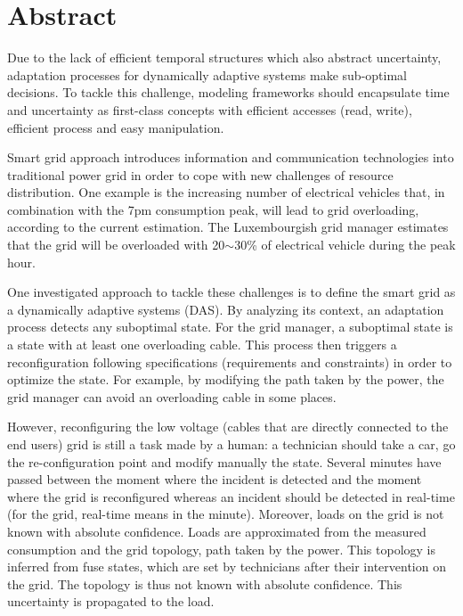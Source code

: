 \chapter*{Abstract}

{
    Due to the lack of efficient temporal structures which also abstract uncertainty, adaptation processes for dynamically adaptive systems make sub-optimal decisions.
	To tackle this challenge, modeling frameworks should encapsulate time and uncertainty as first-class concepts with efficient accesses (read, write), efficient process and easy manipulation.
}

Smart grid approach introduces information and communication technologies into traditional power grid in order to cope with new challenges of resource distribution.
One example is the increasing number of electrical vehicles that, in combination with the 7pm consumption peak, will lead to grid overloading, according to the current estimation.
The Luxembourgish grid manager estimates that the grid will be overloaded with 20$\sim$30\% of electrical vehicle during the peak hour.

One investigated approach to tackle these challenges is to define the smart grid as a dynamically adaptive systems (DAS).
By analyzing its context, an adaptation process detects any suboptimal state.
For the grid manager, a suboptimal state is a state with at least one overloading cable.
This process then triggers a reconfiguration following specifications (requirements and constraints) in order to optimize the state.
For example, by modifying the path taken by the power, the grid manager can avoid an overloading cable in some places.

However, reconfiguring the low voltage (cables that are directly connected to the end users) grid is still a task made by a human: a technician should take a car, go the re-configuration point and modify manually the state.
Several minutes have passed between the moment where the incident is detected and the moment where the grid is reconfigured whereas an incident should be detected in real-time (for the grid, real-time means in the minute).
Moreover, loads on the grid is not known with absolute confidence.
Loads are approximated from the measured consumption and the grid topology, \ie path taken by the power.
This topology is inferred  from fuse states, which are set by technicians after their intervention on the grid.
The topology is thus not known with absolute confidence.
This uncertainty is propagated to the load.

